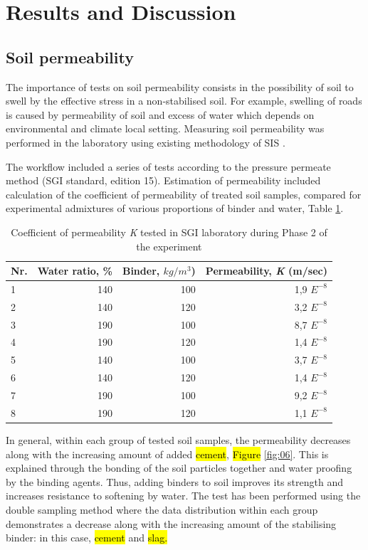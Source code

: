 \documentclass{amestyle}
\begin{document}
\section{Results and Discussion}

\subsection{Soil permeability}
The importance of tests on soil permeability consists in the possibility of soil to swell by the effective stress in a non-stabilised soil. For example, swelling of roads is caused by permeability of soil and excess of water which depends on environmental and climate local setting. Measuring soil permeability was performed in the laboratory using existing methodology of SIS \cite{SIS2019}. 

The workflow included a series of tests according to the pressure permeate method (SGI standard, edition 15). Estimation of permeability included calculation of the coefficient of permeability of treated soil samples, compared for experimental admixtures of various proportions of binder and water, Table \ref{tab:1}.

\begin{table}[htbp]
  \caption{Coefficient of permeability \emph{K} tested in SGI laboratory during Phase 2 of the experiment}
  \label{tab:1}
  \centering
  \begin{tabular}{| l | r | r | r |}
    \hline
    \multicolumn{1}{|c|}{Nr.} &
    \multicolumn{1}{|c|}{Water ratio, \%} &
    \multicolumn{1}{|c|}{Binder, $kg/m^3$)} &
    \multicolumn{1}{|c|}{Permeability, \emph{K} (m/sec) } \\\hline
    1 & 140 & 100 & 1,9 $E^{-8}$ \\
    2 & 140 & 120 & 3,2 $E^{-8}$ \\
    3 & 190 & 100 & 8,7 $E^{-8}$ \\
    4 & 190 & 120 & 1,4 $E^{-8}$ \\
    5 & 140 & 100 & 3,7 $E^{-8}$ \\
    6 & 140 & 120 & 1,4 $E^{-8}$ \\
    7 & 190 & 100 & 9,2 $E^{-8}$ \\
    8 & 190 & 120 & 1,1 $E^{-8}$ \\\hline
  \end{tabular}
\end{table}

In general, within each group of tested soil samples, the permeability decreases along with the increasing amount of added \hl{cement}, \hl{Figure} \ref{fig:06}. This is explained through the bonding of the soil particles together and water proofing by the binding agents. Thus, adding binders to soil improves its strength and increases resistance to softening by water. The test has been performed using the double sampling method where the data distribution within each group demonstrates a decrease along with the increasing amount of the stabilising binder: in this case, \hl{cement} and \hl{slag.} 
\end{document}
